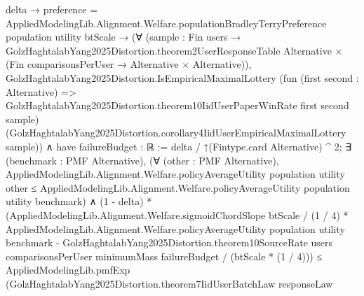 \documentclass[10pt]{article}
\begin{document}
\begin{ReviewVerbatim}
                                    delta →
                                  preference =
                                      AppliedModelingLib.Alignment.Welfare.populationBradleyTerryPreference population
                                        utility btScale →
                                    (∀
                                        (sample :
                                          Fin users →
                                            GolzHaghtalabYang2025Distortion.theorem2UserResponseTable Alternative ×
                                              (Fin comparisonsPerUser → Alternative × Alternative)),
                                        GolzHaghtalabYang2025Distortion.IsEmpiricalMaximalLottery
                                          (fun (first second : Alternative) =>
                                            GolzHaghtalabYang2025Distortion.theorem10IidUserPaperWinRate first second
                                              sample)
                                          (GolzHaghtalabYang2025Distortion.corollary4IidUserEmpiricalMaximalLottery
                                            sample)) ∧
                                      have failureBudget : ℝ := delta / ↑(Fintype.card Alternative) ^ 2;
                                      ∃ (benchmark : PMF Alternative),
                                        (∀ (other : PMF Alternative),
                                            AppliedModelingLib.Alignment.Welfare.policyAverageUtility population utility
                                                other ≤
                                              AppliedModelingLib.Alignment.Welfare.policyAverageUtility population
                                                utility benchmark) ∧
                                          (1 - delta) *
                                              (AppliedModelingLib.Alignment.Welfare.sigmoidChordSlope btScale /
                                                    (1 / 4) *
                                                  AppliedModelingLib.Alignment.Welfare.policyAverageUtility population
                                                    utility benchmark -
                                                GolzHaghtalabYang2025Distortion.theorem10SourceRate users
                                                    comparisonsPerUser minimumMass failureBudget /
                                                  (btScale * (1 / 4))) ≤
                                            AppliedModelingLib.pmfExp
                                              (GolzHaghtalabYang2025Distortion.theorem7IidUserBatchLaw responseLaw

\end{ReviewVerbatim}
\end{document}
